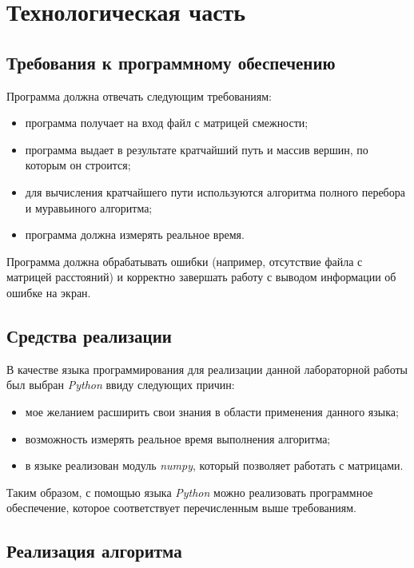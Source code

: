 \chapter{Технологическая часть}

\section{Требования к программному обеспечению}

Программа должна отвечать следующим требованиям:
\begin{itemize}[label=---]
	\item программа получает на вход файл с матрицей смежности;
	\item программа выдает в результате кратчайший путь и массив вершин, по которым он строится;
	\item для вычисления кратчайшего пути используются алгоритма полного перебора и муравьиного алгоритма;
	\item программа должна измерять реальное время.
\end{itemize}

Программа должна обрабатывать ошибки (например, отсутствие файла с матрицей расстояний) и корректно завершать работу с выводом информации об ошибке на экран.
 
\section{Средства реализации}

В качестве языка программирования для реализации данной лабораторной работы был выбран \textit{Python} ввиду следующих причин:
\begin{itemize}[label=---]
	\item мое желанием расширить свои знания в области применения данного языка;
	\item возможность измерять реальное время выполнения алгоритма;
	\item в языке реализован модуль \textit{numpy}, который позволяет работать с матрицами.
\end{itemize}

Таким образом, с помощью языка \textit{Python} можно реализовать программное обеспечение, которое соответствует перечисленным выше требованиям.

\section{Реализация алгоритма}

